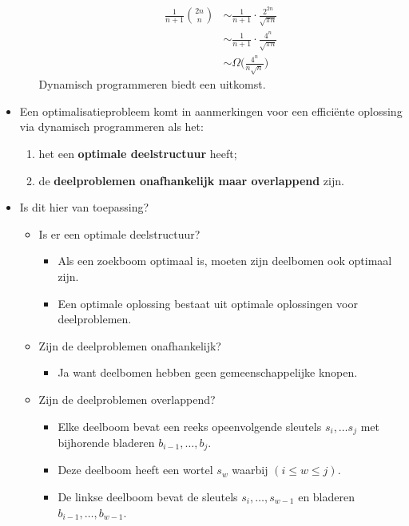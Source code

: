\begin{itemize}
\begin{itemize}
\begin{align*}
            \frac{1}{n + 1}\binom{2n}{n} & \sim \frac{1}{n + 1} \cdot \frac{2^{2n}}{\sqrt{\pi n}} \\
                                         & \sim \frac{1}{n + 1} \cdot \frac{4^{n}}{\sqrt{\pi n}} \\
                                         & \sim \Omega\bigg(\frac{4^n}{n\sqrt{n}}\bigg)
        \end{align*}
        \good Dynamisch programmeren biedt een uitkomst.
    \end{itemize}
    \item Een optimalisatieprobleem komt in aanmerkingen voor een efficiënte oplossing via dynamisch programmeren als het:
    \begin{enumerate}
        \item het een \textbf{optimale deelstructuur} heeft;
        \item de \textbf{deelproblemen onafhankelijk maar overlappend} zijn.
    \end{enumerate}
    \item Is dit hier van toepassing?
    \begin{itemize}
        \item Is er een optimale deelstructuur?
        \begin{itemize}
            \item Als een zoekboom optimaal is, moeten zijn deelbomen ook optimaal zijn.
            \item Een optimale oplossing bestaat uit optimale oplossingen voor deelproblemen.
        \end{itemize}
        \item Zijn de deelproblemen onafhankelijk?
        \begin{itemize}
            \item Ja want deelbomen hebben geen gemeenschappelijke knopen.
        \end{itemize}
        \item Zijn de deelproblemen overlappend?
        \begin{itemize}
            \item Elke deelboom bevat een reeks opeenvolgende sleutels $s_i, \dots s_j$ met bijhorende bladeren $b_{i - 1}, \dots, b_j$.
            \item Deze deelboom heeft een wortel $s_w$ waarbij $(i \leq w \leq j)$.
            \item De linkse deelboom bevat de sleutels $s_i, \dots, s_{w - 1}$ en bladeren $b_{i - 1}, \dots, b_{w - 1}$.

\end{itemize}
\end{itemize}
\end{itemize}
